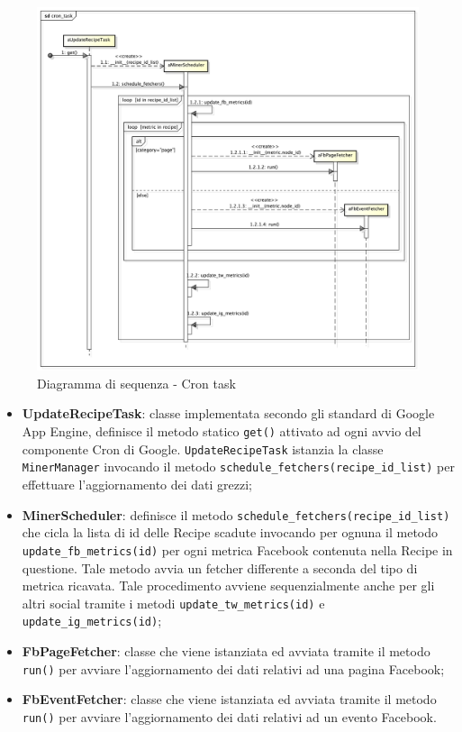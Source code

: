     \begin{figure}[!htbp]
		\centering
			\centerline{\includegraphics[scale=0.4]{./images/sequence_diagram/cron_task.pdf}}
		\caption{Diagramma di sequenza - Cron task}
	\end{figure}

    \begin{itemize}
        \item \textbf{UpdateRecipeTask}: classe implementata secondo gli standard di Google App Engine, definisce il metodo statico \texttt{get()} attivato ad ogni avvio del componente Cron di Google. \texttt{UpdateRecipeTask} istanzia la classe \texttt{MinerManager} invocando il metodo \texttt{schedule\_fetchers(recipe\_id\_list)} per effettuare l'aggiornamento dei dati grezzi;
        \item \textbf{MinerScheduler}: definisce il metodo \texttt{schedule\_fetchers(recipe\_id\_list)} che cicla la lista di id delle Recipe scadute invocando per ognuna il metodo \texttt{update\_fb\_metrics(id)} per ogni metrica Facebook contenuta nella Recipe in questione. Tale metodo avvia un fetcher differente a seconda del tipo di metrica ricavata. Tale procedimento avviene sequenzialmente anche per gli altri social tramite i metodi \texttt{update\_tw\_metrics(id)} e \texttt{update\_ig\_metrics(id)};
        \item \textbf{FbPageFetcher}: classe che viene istanziata ed avviata tramite il metodo \texttt{run()} per avviare l'aggiornamento dei dati relativi ad una pagina Facebook;
        \item \textbf{FbEventFetcher}: classe che viene istanziata ed avviata tramite il metodo \texttt{run()} per avviare l'aggiornamento dei dati relativi ad un evento Facebook.
    \end{itemize}


